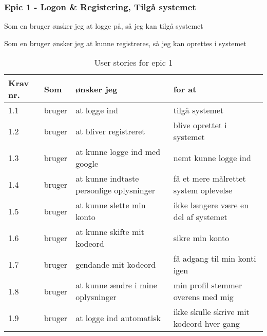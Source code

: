 \subsubsection{Epic 1 - Logon \& Registering, Tilgå systemet}

Som en bruger ønsker jeg at logge på, så jeg kan tilgå systemet

Som en bruger ønsker jeg at kunne registreres, så jeg kan oprettes i systemet

\begin{table}[H]
    \centering
    \caption{User stories for epic 1}
    \label{tab:us-epic1}
    \begin{tabular}{l|l|l|l}
        \textbf{Krav nr.} & \textbf{Som} & \textbf{ønsker jeg}                      & \textbf{for at}                          \\
        \hline
        1.1               & bruger       & at logge ind                             & tilgå systemet                           \\
        \hline
        1.2               & bruger       & at bliver registreret                    & blive oprettet i systemet                \\
        \hline
        1.3               & bruger       & at kunne logge ind med google            & nemt kunne logge ind                     \\
        \hline
        1.4               & bruger       & at kunne indtaste personlige oplysninger & få et mere målrettet system oplevelse    \\
        \hline
        1.5               & bruger       & at kunne slette min konto                & ikke længere være en del af systemet     \\
        \hline
        1.6               & bruger       & at kunne skifte mit kodeord              & sikre min konto                          \\
        \hline
        1.7               & bruger       & gendande mit kodeord                     & få adgang til min konti igen             \\
        \hline
        1.8               & bruger       & at kunne ændre i mine oplysninger        & min profil stemmer overens med mig       \\
        \hline
        1.9               & bruger       & at logge ind automatisk                  & ikke skulle skrive mit kodeord hver gang \\
    \end{tabular}
\end{table}

